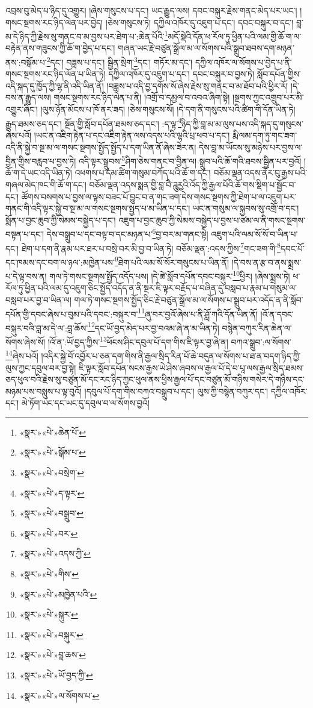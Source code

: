 འབྲས་བུ་མེད་པ་ཉིད་དུ་འགྱུར། །ཞེས་གསུངས་པ་དང་། ཡང་རྒྱུད་ལས། དབང་བསྐུར་རྗེས་གནང་མེད་པར་ཡང་། །གསང་སྔགས་རང་ཉིད་ལེན་པར་བྱེད། །ཅེས་གསུངས་ཏེ། དཀྱིལ་འཁོར་དུ་འཇུག་པ་དང་། དབང་བསྐུར་བ་དང་། བླ་མ་དེ་ཉིད་ཀྱི་རྗེས་སུ་གནང་བ་མ་བྱས་པར་ཐེག་པ་:ཆེན་པོའི་\footnote{«སྣར་»«པེ་»ཆེན་པོ་}མདོ་སྡེའི་དོན་ཕ་རོལ་ཏུ་ཕྱིན་པའི་ལམ་གྱི་ཆོ་ག་ལ་བརྟེན་ནས་གཟུངས་ཀྱི་ཆོ་ག་བྱེད་པ་དང་། གཞན་ཡང་རྗེ་བཙུན་སྒྲོལ་མ་ལ་སོགས་པའི་སྒྲུབ་ཐབས་དག་མཉན་ནས་:བསྒོམ་པ་\footnote{«སྣར་»«པེ་»སྒོམ་པ་}དང་། བཟླས་པ་དང་། སྦྱིན་སྲེག་\footnote{«སྣར་»«པེ་»བསྲེག་}དང་། གཏོར་མ་དང་། དཀྱིལ་འཁོར་ལ་སོགས་པ་བྱེད་པ་ནི་གསང་སྔགས་རང་ཉིད་ལོན་པ་ཡིན་ཏེ། དཀྱིལ་འཁོར་དུ་འཇུག་པ་དང་། དབང་བསྐུར་བ་བྱས་ཏེ། སློབ་དཔོན་གྱིས་འདི་སྐད་དུ་ཁྱོད་ཀྱི་ལྷ་ནི་འདི་ཡིན་ནོ། །བཟླས་པ་འདི་བྱ་དགོས་སོ་ཞེས་རྗེས་སུ་གནང་བ་མ་ཐོབ་པའི་ཕྱིར་རོ། །དེ་བས་ན་རྒྱུད་ལས། གསང་སྔགས་རང་ཉིད་ལེན་པ་ནི། །འགྲོ་བ་དམྱལ་བ་འབའ་ཞིག་སྟེ། །སྔགས་ཀྱང་འགྲུབ་པར་མི་འགྱུར་ཞིང་། །ལུས་ཉོན་མོངས་པ་ཁོ་ནར་ཟད། །ཅེས་གསུངས་སོ། །དེ་དག་ནི་གསུངས་པའི་ཚིག་གི་དོན་ཡིན་ཏེ། རྒྱུད་ཐམས་ཅད་དང་། སྔོན་གྱི་སློབ་དཔོན་ཐམས་ཅད་དང་། :ད་ལྟ་\footnote{«སྣར་»«པེ་»ད་ལྟར་}ཉིད་ཀྱི་བླ་མ་མ་ལུས་པས་འདི་སྐད་དུ་གསུངས་ཞེས་པའོ། །ཡང་ན་འཇིག་རྟེན་པ་དང་འཇིག་རྟེན་ལས་འདས་པའི་ལྷའི་པྲ་ཕབ་པ་དང་། རྨི་ལམ་དག་ཏུ་གང་ཟག་འདི་ནི་སྐྱེ་བ་སྔ་མ་ལ་གསང་སྔགས་སྤྱོད་སྤྱོད་པ་དག་ཡིན་ནོ་ཞེས་ཟེར་ན། དེས་བླ་མ་ཡོངས་སུ་མཉེས་པར་བྱས་ལ་བྱིན་གྱིས་བརླབ་པ་བྱས་ཏེ། འདི་ལྟར་སྒྲུབས་\footnote{«སྣར་»«པེ་»བསྒྲུབ་}ཤིག་ཅེས་གནང་བ་བྱིན་ལ། སྒྲུབ་པའི་ཆོ་གའི་ཐབས་སྦྱིན་པར་བྱའོ། །ཆོ་ག་དེ་ཡང་འདི་ཡིན་ཏེ། འཕགས་པ་དམ་ཚིག་གསུམ་བཀོད་པའི་ཆོ་ག་དང་། བཅོམ་ལྡན་འདས་ནོར་བུ་རྒྱས་པའི་གཞལ་མེད་ཁང་གི་ཆོ་ག་དང་། བཅོམ་ལྡན་འདས་སྨན་གྱི་བླ་བཻ་ཌཱུརྱའི་འོད་ཀྱི་རྒྱལ་པོའི་ཆོ་གས་སྡིག་པ་སྦྱོང་བ་དང་། ཚོགས་བསགས་པ་བྱས་ལ་ལྟས་བཟང་པོ་བྱུང་བ་ན་གང་ཟག་དེས་གསང་སྔགས་ཀྱི་ཐེག་པ་ལ་འཇུག་པར་གནང་གི་འདི་ལྟར་སྐྱེ་བ་སྔ་མ་ལ་གསང་སྔགས་སྤྱད་པ་མ་ཡིན་པ་དང་། ཡང་ན་གསུམ་ལ་སྐྱབས་སུ་འགྲོ་བ་དང་། སྨོན་པ་བྱང་ཆུབ་ཀྱི་སེམས་བསྐྱེད་པ་དང་། འཇུག་པ་བྱང་ཆུབ་ཀྱི་སེམས་བསྐྱེད་པ་བྱས་པ་ཙམ་ལ་ནི་གསང་སྔགས་བསྟན་པ་དང་། དེས་བསྒྲུབ་པ་དང་བལྟ་བ་དང་མཉན་པ་\footnote{«སྣར་»«པེ་»བར་}བྱ་བར་མ་གནང་སྟེ། འཇུག་པའི་ལམ་སོ་སོ་བ་ཡིན་པ་དང་། ཐེག་པ་དག་ནི་རྣམ་པར་ཐར་པ་བསྲེ་བར་མི་བྱ་བ་ཡིན་ཏེ། བཅོམ་ལྡན་:འདས་ཀྱིས་\footnote{«སྣར་»«པེ་»འདས་ཀྱི་}གང་ཟག་གི་\footnote{«སྣར་»«པེ་»གིས་}དབང་པོ་དང་ཁམས་དང་བག་ལ་ཉལ་:མཁྱེན་པས་\footnote{«སྣར་»«པེ་»མཁྱེན་པའི་}ཐེག་པའི་ལམ་སོ་སོར་གསུངས་པ་ཡིན་ནོ། །དེ་བས་ན་རྩ་བ་ནས་སྨྲས་པ་དེ་ལྟ་བས་ན། གལ་ཏེ་གསང་སྔགས་སྤྱོད་འདོད་པས། །དེ་ཚེ་སློབ་དཔོན་དབང་བསྐུར་\footnote{«སྣར་»«པེ་»སྐུར་}ཕྱིར། །ཞེས་སྨྲས་ཏེ། ཕ་རོལ་ཏུ་ཕྱིན་པའི་ལམ་དུ་འཇུག་ཅིང་སྤྱོད་འདོད་ན་ནི་སྔར་ཇི་ལྟར་བརྗོད་པ་བཞིན་དུ་བསླབ་པ་རྣམ་པ་གསུམ་ལ་བསླབ་པར་བྱ་བ་ཡིན་ལ། གལ་ཏེ་གསང་སྔགས་སྤྱོད་ཅིང་རྗེ་བཙུན་སྒྲོལ་མ་ལ་སོགས་པ་སྒྲུབ་པར་འདོད་ན་ནི་སློབ་དཔོན་གྱི་དབང་ཞེས་པ་བུམ་པའི་དབང་:བསྐུར་བ་\footnote{«སྣར་»«པེ་»བསྐུར་}ཞུ་བར་བྱའོ་ཞེས་པ་ནི་ཤློ་ཀའི་དོན་ཡིན་ནོ། །འོ་ན་དབང་བསྐུར་བའི་བླ་མ་དེ་ལ་:བླ་ཆོས་\footnote{«སྣར་»«པེ་»བླ་ཆས་}དང་ཡོ་བྱད་མེད་པར་བྱ་བའམ་ཞེ་ན་མ་ཡིན་ཏེ། བསྙེན་བཀུར་རིན་ཆེན་ལ་སོགས་ཞེས་སོ། །འོ་ན་:ཡོ་བྱད་ཀྱིས་\footnote{«སྣར་»«པེ་»ཡོ་བྱད་ཀྱི་}ཕོངས་ཤིང་དབུལ་པོ་དག་གིས་ཇི་ལྟར་བྱ་ཞེ་ན། བཀའ་སྒྲུབ་:ལ་སོགས་\footnote{«སྣར་»«པེ་»ལ་སོགས་པ་}ཞེས་པའོ། །འདིར་སྐྱེ་བོ་འབྱོར་པ་ཅན་དག་གིས་ནི་རྒྱལ་སྲིད་རིན་པོ་ཆེ་བདུན་ལ་སོགས་པ་ཐ་ན་བདག་ཉིད་ཀྱི་ལུས་ཀྱང་དབུལ་བར་བྱ་སྟེ། ཇི་ལྟར་སློབ་དཔོན་སངས་རྒྱས་ཡེ་ཤེས་ཞབས་ལ་རྒྱལ་པོ་དེ་བ་པཱ་ལས་རྒྱལ་སྲིད་ཐམས་ཅད་ཕུལ་བའི་རྗེས་སུ་བཙུན་མོ་དང་རང་ཉིད་ཀྱང་ཕུལ་ནས་ཕྱིས་རྒྱལ་པོ་དང་བཙུན་མོ་གཉིས་གསེར་དེ་གཉིས་དང་མཉམ་པས་བསླུས་པ་ལྟ་བུའོ། །དབུལ་པོ་དག་གིས་བཀའ་བསྒྲུབ་པ་དང་། ལུས་ཀྱི་བསྙེན་བཀུར་དང་། དཀྱིལ་འཁོར་དང་། མེ་ཏོག་ཡང་དང་ཡང་དུ་དབུལ་བ་ལ་སོགས་བྱའོ། 